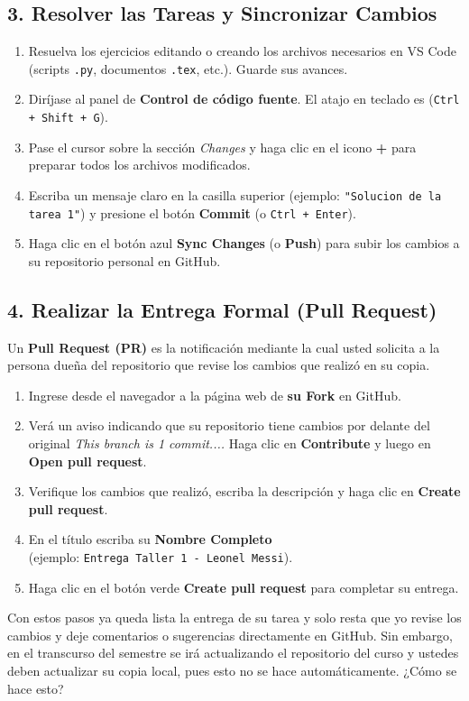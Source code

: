 \documentclass[12pt]{article}
\begin{document}
\subsection*{3. Resolver las Tareas y Sincronizar Cambios}
\begin{enumerate}[label=\arabic*)]
    \item Resuelva los ejercicios editando o creando los archivos necesarios en VS Code 
    (scripts \lstinline|.py|, documentos \lstinline|.tex|, etc.). Guarde sus avances.
    \item Diríjase al panel de \textbf{Control de código fuente}. El atajo en teclado es 
    (\lstinline|Ctrl + Shift + G|).
    \item Pase el cursor sobre la sección \emph{Changes} y haga clic en el icono \textbf{+} para preparar todos los archivos modificados.
    \item Escriba un mensaje claro en la casilla superior 
    (ejemplo: \lstinline|"Solucion de la tarea 1"|) y presione el botón \textbf{Commit} (o \lstinline|Ctrl + Enter|).
    \item Haga clic en el botón azul \textbf{Sync Changes} (o \textbf{Push}) para subir los cambios a su repositorio personal en GitHub.
\end{enumerate}

\subsection*{4. Realizar la Entrega Formal (Pull Request)}
Un \textbf{Pull Request (PR)} es la notificación mediante la cual usted solicita 
a la persona dueña del repositorio que revise los cambios que realizó en su copia.

\begin{enumerate}[label=\arabic*)]
    \item Ingrese desde el navegador a la página web de \textbf{su Fork} en GitHub.
    \item Verá un aviso indicando que su repositorio tiene cambios por delante del original
    \textit{This branch is 1 commit....} 
    Haga clic en \textbf{Contribute} y luego en \textbf{Open pull request}.
    \item Verifique los cambios que realizó, escriba la descripción y haga clic 
    en \textbf{Create pull request}.
    \item En el título escriba su \textbf{Nombre Completo} \\
    (ejemplo: \texttt{Entrega Taller 1 - Leonel Messi}).
    \item Haga clic en el botón verde \textbf{Create pull request} para completar su entrega.
\end{enumerate}
Con estos pasos ya queda lista la entrega de su tarea y solo resta que yo revise los cambios 
y deje comentarios o sugerencias directamente en GitHub. Sin embargo, 
en el transcurso del semestre se irá actualizando el repositorio del curso
y ustedes deben actualizar su copia local, pues esto no se hace automáticamente. 
¿Cómo se hace esto? 
\end{document}
